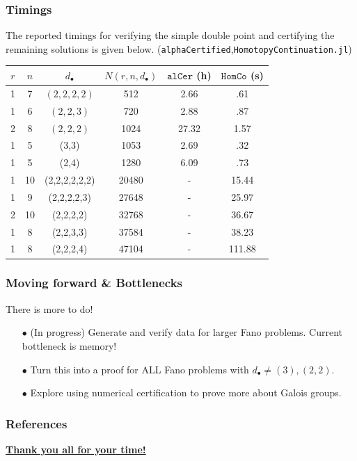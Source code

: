 \documentclass{beamer}
\theoremstyle{definition}
\begin{document}
\begin{frame}
\frametitle{Timings}
The reported timings for verifying the simple double point and certifying the remaining solutions is given below. (\texttt{alphaCertified},\texttt{HomotopyContinuation.jl})
\vspace{-.1cm}
\hspace{-.2cm}
\begin{minipage}{.99\textwidth}
\begin{table}[htb]
  \label{Small Fano}
  \def\arraystretch{.97}
  \begin{tabular}{||c|c|c|c|c|c||}
    \hline
    $r$ & $n$ & $d_\bullet$ & $N(r,n,d_\bullet)$ & $\texttt{alCer}$ (h) & $\texttt{HomCo}$ (s)\\
    \hline\hline
    1 & 7 & $(2,2,2,2)$ & 512 & 2.66 & .61\\
    \hline
    1 & 6 & $(2,2,3)$ & 720  & 2.88 & .87\\
    \hline
    2 & 8 & $(2,2,2)$ & 1024 & 27.32 & 1.57\\
    \hline
    1 & 5 & (3,3) & 1053 & 2.69 & .32\\
    \hline
    1 & 5 & (2,4) & 1280 & 6.09 & .73\\
    \hline
    1 & 10 & (2,2,2,2,2,2) & 20480 & - & 15.44\\
    \hline
    1 & 9 & (2,2,2,2,3) & 27648 & - & 25.97\\
    \hline
    2 & 10 & (2,2,2,2) & 32768 & - & 36.67\\
    \hline
    1 & 8 & (2,2,3,3) & 37584 & - & 38.23\\
    \hline
    1 & 8 & (2,2,2,4) & 47104 & - & 111.88\\
    \hline
  \end{tabular}
\end{table}
\end{minipage}
\end{frame}





%
\begin{frame}
\frametitle{Moving forward \& Bottlenecks}

There is more to do!
\begin{enumerate}
\item[$\bullet$] (In progress) Generate and verify data for larger Fano problems. Current bottleneck is memory!

\item[$\bullet$] Turn this into a proof for ALL Fano problems with $d_\bullet\ne(3),(2,2)$.

\item[$\bullet$] Explore using numerical certification to prove more about Galois groups.
\end{enumerate}
\end{frame}


\begin{frame}[allowframebreaks]
\frametitle{References}
\vspace{-.3cm}
\begin{center}
\textbf{\underline{Thank you all for your time!}}
\end{center}
\vspace{-.3cm}


\cite{HCJL,DM,Harris,HK,alphaCertified,Jordan}
\end{frame}
\end{document}
